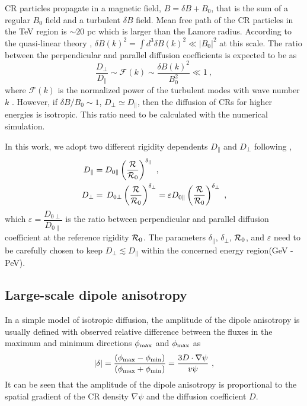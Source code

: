 \documentclass[a4paper,11pt]{article}
\begin{document}
CR particles propagate in a magnetic field, $B=\delta B +B_0$, that is the sum  of a regular  $B_0$ field and a turbulent $\delta B$ field. Mean free path of the CR particles in the TeV region is $\sim20$ pc which is larger than the Lamore radius. According to   the quasi-linear theory 
\citep {1966ApJ...146..480J, 1968PhRvL..21...44J},  $\delta B(k)^2=\int{d^3\delta B(k)^2\ll|B_0|^2} $ at this scale.
The ratio between the perpendicular and parallel diffusion coefficients is expected to be as
\begin{equation}
\dfrac{D_\perp}{D_\parallel} \sim \mathcal{F}(k) \sim \dfrac{\delta B(k)^2}{B_0^2} \ll 1 ~,
\label{eq:Dration}
\end{equation}
where $\mathcal{F}(k)$ is the normalized power of the turbulent modes with wave number $k$ \citep {2017JCAP...10..019C, 2015PhRvL.114b1101M, 2015ApJ...799..157B}.
However,  if $\delta B/B_0\sim1$, $D_\perp\simeq D_\|$, then the diffusion of CRs for higher energies is isotropic.
This ratio need to be calculated with the numerical simulation. 

In this work, we adopt two different rigidity dependents $D_\parallel$ and $D_\perp$    following  \citep{2017JCAP...10..019C},
\begin{align}
D_\parallel &= D_{0\parallel} \left(\frac{\cal R}{{\cal R}_0} \right)^{\delta_\|} ~, \\
D_\perp &=\,D_{0\perp} \left(\frac{\cal R}{{\cal R}_0} \right)^{\delta_\perp} = \varepsilon D_{0\parallel} \left(\frac{\cal R}{{\cal R}_0} \right)^{\delta_\perp} ~,
\label{eq:DparaDperp}
\end{align}
which $\varepsilon = \dfrac{D_{0\perp}}{D_{0\parallel} }$ is the ratio between perpendicular and parallel diffusion coefficient at the reference rigidity ${\cal R}_{0}$. 
The parameters $\delta_\parallel$, $\delta_\perp$, ${\cal R}_{0}$, and $\varepsilon$ need to be carefully chosen to keep $D_\perp\lesssim D_\parallel$ within the concerned energy region(GeV - PeV). 



\subsection{ Large-scale dipole anisotropy}
In a simple model of isotropic
diffusion, the amplitude of the dipole anisotropy is usually defined with observed relative difference between the fluxes in the maximum and
minimum directions $\phi_{\rm max}$ and $\phi_{\rm max}$   
as \citep{2015PhRvL.114b1101M}
\begin{equation}
|\delta| = \dfrac{(\phi_{\rm max}-\phi_{\rm min})}{(\phi_{\rm max}+\phi_{\rm min})}=\dfrac{3D \cdot \nabla \psi}{v \psi} ~,
\end{equation}
It can be seen that the amplitude of the dipole anisotropy is proportional to the spatial gradient of the CR density $\nabla \psi$ and the diffusion coefficient $D$.
\end{document}
